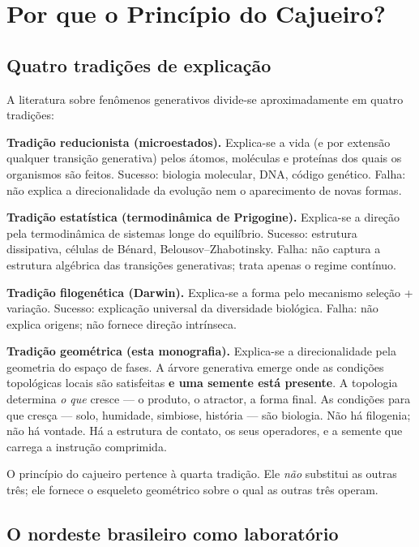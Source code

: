 \documentclass[12pt,a4paper,twoside]{book}
\theoremstyle{plain}
\theoremstyle{definition}
\theoremstyle{definition}
\begin{document}
\chapter{Por que o Princípio do Cajueiro?}
\label{cap:porque-cajueiro}

\section{Quatro tradições de explicação}

A literatura sobre fenômenos generativos divide-se aproximadamente em
quatro tradições:

\textbf{Tradição reducionista (microestados).} Explica-se a vida (e por
extensão qualquer transição generativa) pelos átomos, moléculas e
proteínas dos quais os organismos são feitos. Sucesso: biologia molecular,
DNA, código genético. Falha: não explica a direcionalidade da evolução
nem o aparecimento de novas formas.

\textbf{Tradição estatística (termodinâmica de Prigogine).} Explica-se a
direção pela termodinâmica de sistemas longe do equilíbrio. Sucesso:
estrutura dissipativa, células de Bénard, Belousov--Zhabotinsky. Falha:
não captura a estrutura algébrica das transições generativas; trata
apenas o regime contínuo.

\textbf{Tradição filogenética (Darwin).} Explica-se a forma pelo
mecanismo seleção + variação. Sucesso: explicação universal da diversidade
biológica. Falha: não explica origens; não fornece direção intrínseca.

\textbf{Tradição geométrica (esta monografia).} Explica-se a direcionalidade
pela geometria do espaço de fases. A árvore generativa emerge onde as
condições topológicas locais são satisfeitas \textbf{e uma semente está
presente}. A topologia determina \emph{o que} cresce --- o produto, o
atractor, a forma final. As condições para que cresça --- solo, humidade,
simbiose, história --- são biologia. Não há filogenia; não há vontade. Há a
estrutura de contato, os seus operadores, e a semente que carrega a instrução
comprimida.

O princípio do cajueiro pertence à quarta tradição. Ele \emph{não}
substitui as outras três; ele fornece o esqueleto geométrico sobre o qual as
outras três operam.

\section{O nordeste brasileiro como laboratório}
\end{document}
